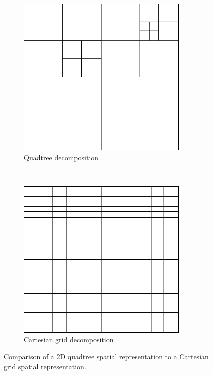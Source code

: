 \documentclass{article}
\begin{document}
\begin{figure}
    \centering
    \begin{subfigure}[b]{.3\textwidth}
    	    \includegraphics[width=\textwidth]{treecomp_quad}
    	    \caption{Quadtree decomposition}
    	    \label{fig:treecomp_quad}
    	\end{subfigure}
    	~
    	\begin{subfigure}[b]{.3\textwidth}
    	    \includegraphics[width=\textwidth]{treecomp_grid}
    	    \caption{Cartesian grid decomposition}
    	    \label{fig:treecomp_grid}
    	\end{subfigure}
    \caption{Comparison of a 2D quadtree spatial representation to a Cartesian grid spatial representation.}
    \label{fig:treecomp}
\end{figure}
\end{document}
